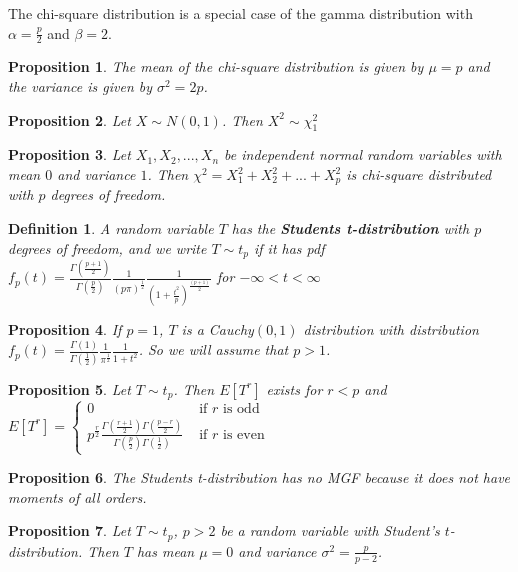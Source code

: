 \documentclass[14pt,twoside]{extreport}
\theoremstyle{dotless}
\newtheorem*{defn}{\footnotesize Definition}
\newtheorem*{prop}{\footnotesize Proposition} %
\begin{document}
The chi-square distribution is a special case of the gamma distribution with $\alpha = \frac{p}{2}$ and $\beta = 2$.

\begin{prop}
The mean of the chi-square distribution is given by $\mu = p$ and the variance is given by $\sigma^2 = 2p$.
\end{prop}

\begin{prop}
Let $X \sim N(0,1)$. Then $X^2 \sim \chi_1^2$
\end{prop}

\begin{prop}
    Let $X_1, X_2, ..., X_n$ be independent normal random variables with mean $0$ and variance $1$. Then $\chi^2 = X_1^2 + X_2^2 + ... + X_p^2$ is chi-square distributed with $p$ degrees of freedom.
\end{prop}

\begin{defn}
    A random variable $T$ has the \textbf{Students t-distribution} with $p$ degrees of freedom, and we write $T \sim t_p$ if it has pdf $f_p (t) = \displaystyle \frac{\Gamma(\frac{p+1}{2})}{\Gamma(\frac{p}{2})} \frac{1}{(p \pi)^{\frac{1}{2}}} \frac{1}{(1 + \frac{t^2}{p})^{\frac{(p+1)}{2}}} $ for $- \infty < t < \infty$
\end{defn}

\begin{prop}
    If $p=1$, $T$ is a Cauchy$(0,1)$ distribution with distribution $f_p(t) = \displaystyle\frac{\Gamma(1)}{\Gamma(\frac{1}{2})} \frac{1}{\pi^\frac{1}{2}} \frac{1}{1+t^2}$. So we will assume that $p > 1$.
\end{prop}

\begin{prop}
    Let $T \sim t_p$. Then $E[T^r]$ exists for $r < p$ and \\ $E[T^r] = \begin{cases} 0 & \text{ if } r \text{ is odd } \\   \displaystyle p^{\frac{r}{2}} \frac{\Gamma(\frac{r+1}{2})\Gamma(\frac{p-r}{2})}{\Gamma(\frac{p}{2})\Gamma(\frac{1}{2})} & \text{ if } r \text{ is even }\end{cases}$
\end{prop}

\begin{prop}
    The Students t-distribution has no MGF because it does not have moments of all orders.
\end{prop}

\begin{prop}
    Let $T \sim t_p$, $p > 2$ be a random variable with Student's $t$-distribution. Then $T$ has mean $\mu = 0$ and variance $\sigma^2 = \displaystyle \frac{p}{p-2}$.
\end{prop}
\end{document}
